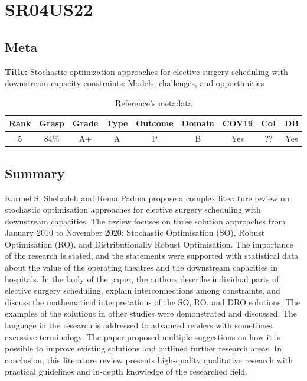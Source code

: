 \section{ SR04US22 }


\subsection{Meta}

    \textbf{Title:}
    Stochastic optimization approaches for elective surgery scheduling with downstream capacity constraints: Models, challenges, and opportunities

    \begin{table}[H]
        \centering
        \begin{tabular}{|c|c|c|c|c|c|c|c|c|}
            \hline
                \textbf{Rank} & \textbf{Grasp} & \textbf{Grade} & \textbf{Type} & \textbf{Outcome} & \textbf{Domain} & \textbf{COV19} & \textbf{CoI} & \textbf{DB} \\
            \hline
                5 & 84\% & A+ & A & P & B & Yes & ?? & Yes \\
            \hline
        \end{tabular}
        \caption{Reference's metadata}
        \label{tab:SR02CN23}
    \end{table}

\subsection{Summary}
    Karmel S. Shehadeh and Rema Padma \cite{x335} propose a complex literature review on stochastic optimisation approaches for elective surgery scheduling with downstream capacities. The review focuses on three solution approaches from January 2010 to November 2020: Stochastic Optimisation (SO), Robust Optimisation (RO), and Distributionally Robust Optimisation. The importance of the research is stated, and the statements were supported with statistical data about the value of the operating theatres and the downstream capacities in hospitals. In the body of the paper, the authors describe individual parts of elective surgery scheduling, explain interconnections among constraints, and discuss the mathematical interpretations of the SO, RO, and DRO solutions. The examples of the solutions in other studies were demonstrated and discussed. The language in the research is addressed to advanced readers with sometimes excessive terminology. The paper proposed multiple suggestions on how it is possible to improve existing solutions and outlined further research areas. In conclusion, this literature review presents high-quality qualitative research with practical guidelines and in-depth knowledge of the researched field.   

